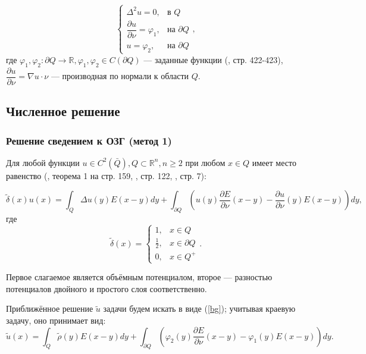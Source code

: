 \documentclass[a4paper]{article}
\newcommand{\R}[1]{\mathbb{R}^#1}
\newcommand{\der}[2]{\dfrac{\partial #1}{\partial #2}}
\begin{document}
\[
  \begin{cases}
\Delta^2 u=0, & \text{в $Q$} \\
\der{u}{\nu}=\varphi_1, & \text{на $\partial Q$}\\
u=\varphi_2, & \text{на $\partial Q$}
\end{cases},
\]
где $\varphi_1, \varphi_2: \partial Q \rightarrow \mathbb{R},\varphi_1, \varphi_2 \in C(\partial Q) $ --- заданные функции (\cite{samar}, стр. 422-423),
$\der{u}{\nu}=\nabla u \cdot \nu$ --- производная по нормали к области $Q$.

\subsection{Численное решение}
\subsubsection{Решение сведением к ОЗГ (метод 1)}
Для любой функции $u \in C^2(\bar Q), Q \subset \R{n}, n \geq 2$
при любом $x \in Q$ имеет место равенство (\cite{mich}, теорема 1 на стр. 159, \cite{lezh}, стр. 122, \cite{lezh2}, стр. 7):

\begin{equation}
   \tilde{\delta}(x) u(x)= \int_Q \Delta u(y) E(x-y) dy + \int_{\partial Q} \left(u(y)\der{E}{\nu}(x-y)-\der{u}{\nu}(y) E(x-y) \right) dy,
    \label{bg}
\end{equation}
где 
\[
    \tilde{\delta}(x) =
\begin{cases}
1, & x \in Q \\
\frac{1}{2}, & x \in \partial Q\\ 
0,& x \in Q^+ 
\end{cases}.
\]
  
Первое слагаемое является объёмным потенциалом, второе --- разностью потенциалов двойного и простого слоя соответственно.

Приближённое решение $\tilde{u}$ задачи будем искать в виде (\ref{bg}); учитывая краевую задачу, оно принимает вид:
\begin{equation}
  \tilde{u}(x)= \int_Q \tilde{\rho}(y) E(x-y) dy + \int_{\partial Q} \left(\varphi_2(y)\der{E}{\nu}(x-y)-\varphi_1(y) E(x-y) \right) dy.
  \label{u1}
\end{equation}
\end{document}
